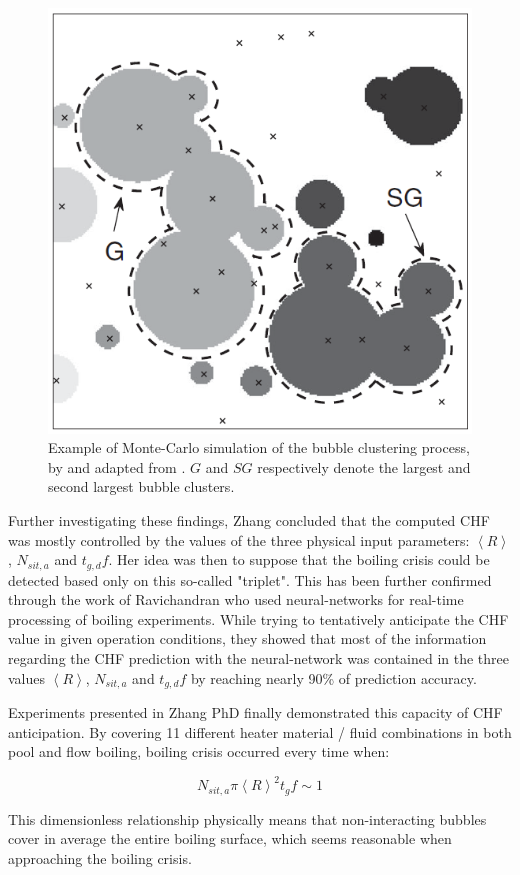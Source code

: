 \begin{figure}[!h]
\centering
\includegraphics[width=0.35\linewidth]{img/chf/chf_zhang_cluster.png}
\caption{Example of Monte-Carlo simulation of the bubble clustering process, by and adapted from \cite{zhang_prl}. $G$ and $SG$ respectively denote the largest and second largest bubble clusters.}
\label{fig:chf_zhang_cluster}
\end{figure}

\npar

Further investigating these findings, Zhang \cite{zhang_new_2022} concluded that the computed CHF was mostly controlled by the values of the three physical input parameters:  $\left<R\right>$, $N_{sit,a}$ and $t_{g,d}f$. Her idea was then to suppose that the boiling crisis could be detected based only on this so-called "triplet". This has been further confirmed through the work of Ravichandran \etal \cite{ravichandran_online_2019, ravichandran_infrared_2022} who used neural-networks for real-time processing of boiling experiments. While trying to tentatively anticipate the CHF value in given operation conditions, they showed that most of the information regarding the CHF prediction with the neural-network was contained in the three values $\left<R\right>$, $N_{sit,a}$ and $t_{g,d}f$ by reaching nearly 90\% of prediction accuracy.

\npar

Experiments presented in Zhang PhD \cite{zhang_new_2022} finally demonstrated this capacity of CHF anticipation. By covering 11 different heater material / fluid combinations in both pool and flow boiling, boiling crisis occurred every time when:

\begin{equation}
N_{sit,a} \pi \left<R\right>^{2} t_{g}f \sim 1
\label{eq:chf_zang}
\end{equation}

This dimensionless relationship physically means that non-interacting bubbles cover in average the entire boiling surface, which seems reasonable when approaching the boiling crisis.


